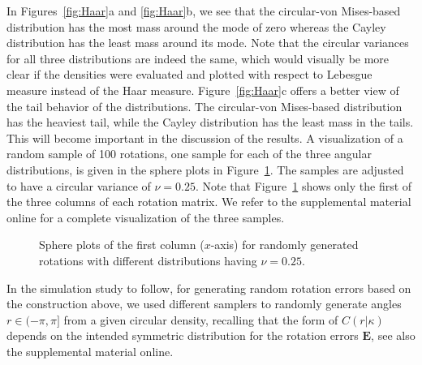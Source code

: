 In Figures~\ref{fig:Haar}a and \ref{fig:Haar}b, we see that the circular-von Mises-based distribution has the most mass around the mode of zero whereas the Cayley distribution has the least mass around its mode.  Note that the circular variances for all three distributions are indeed the same, which would visually be more clear if the densities  were evaluated and plotted with respect to Lebesgue measure instead of the Haar measure. Figure~\ref{fig:Haar}c offers a better view of the tail behavior of the distributions.  The circular-von Mises-based distribution has the heaviest tail, while the Cayley distribution has the least mass in the tails. This will become important in the discussion of the results. A visualization of a random sample of 100 rotations, one sample for each of the three angular distributions, is given in the sphere plots in Figure~\ref{eyeballs}. The samples are adjusted to have a circular variance of $\nu = 0.25$.  Note that Figure~\ref{eyeballs} shows only the first of the three columns of each rotation matrix. We refer to the supplemental material online for a complete visualization of the three samples.
\begin{figure}[htbp]
\centering
{}
\caption{\label{eyeballs}Sphere plots of the first column ($x$-axis) for randomly generated rotations with different distributions having  $\nu = 0.25$.}
\end{figure}
In the simulation study to follow, for generating random rotation errors based on the construction above, we used different samplers to randomly generate angles $r\in(-\pi,\pi]$ from a given circular density, recalling that the form of $C(r|\kappa)$ depends on the intended symmetric distribution for the rotation errors $\bm{E}$, see also the supplemental material online.


